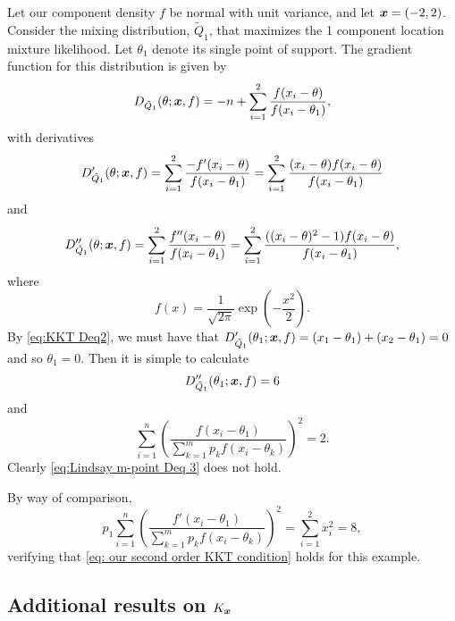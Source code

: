 	Let our component density $f$ be normal with unit variance, and let ${\bm{{x}}} = (-2,2)$. Consider the mixing distribution, $\tilde{Q}_1$, that maximizes the 1 component location mixture likelihood. Let $\theta_1$ denote its single point of support. The gradient function for this distribution is given by
	\begin{equation}
		D_{\tilde{Q}_1}(\theta;{\bm{{x}}}, f) = -n + \sum_{i = 1}^2 \frac{f(x_i - \theta)}{f(x_i - \theta_1)},
	\end{equation}
	with derivatives
	\begin{equation}
		D_{\tilde{Q}_1}'(\theta;{\bm{{x}}}, f) = \sum_{i = 1}^2 \frac{-f'(x_i - \theta)}{f(x_i - \theta_1)} = \sum_{i = 1}^2 \frac{(x_i - \theta) f(x_i - \theta)}{f(x_i - \theta_1)}
	\end{equation}
	and
	\begin{equation}
		D_{\tilde{Q}_1}''(\theta;{\bm{{x}}}, f) = \sum_{i = 1}^2 \frac{f''(x_i - \theta)}{f(x_i - \theta_1)} = \sum_{i = 1}^2 \frac{((x_i - \theta)^2 - 1)f(x_i - \theta)}{f(x_i - \theta_1)},
	\end{equation}
	where
	\begin{equation}
		f(x) = \frac{1}{\sqrt{2 \pi}} \exp\left(-\frac{x^2}{2}\right).
	\end{equation}
	By \eqref{eq:KKT Deq2}, we must have that $D'_{\tilde{Q}_1}(\theta_1;{\bm{{x}}}, f) = (x_1 - \theta_1) + (x_2 - \theta_1) = 0$ and so $\theta_1 = 0$. Then it is simple to calculate
	\begin{equation}
		D_{\tilde{Q}_1}''(\theta_1;{\bm{{x}}}, f) = 6
	\end{equation}
	and
	\begin{equation}
		\sum_{i = 1}^n \left(\frac{f(x_i - \theta_1)}{\sum_{k = 1}^m p_k f(x_i - \theta_k)}\right)^2 = 2.
	\end{equation}
	Clearly \eqref{eq:Lindsay m-point Deq 3} does not hold. 

	By way of comparison, 
	\begin{equation}
		p_1 \sum_{i = 1}^n \left(\frac{f'(x_i - \theta_1)}{\sum_{k = 1}^m p_k f(x_i - \theta_k)}\right)^2 = \sum_{i = 1}^2 x_i^2 = 8,
	\end{equation}
	verifying that \eqref{eq: our second order KKT condition} holds for this example.


	\subsection{Additional results on \texorpdfstring{$K_{\bm{{x}}}$}{Kx}}

